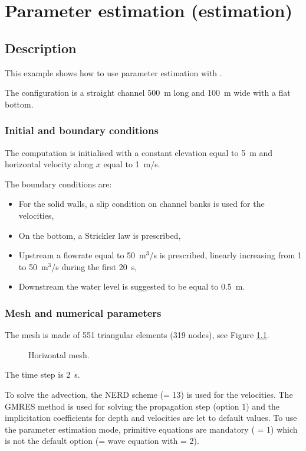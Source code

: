 \chapter{Parameter estimation (estimation)}

\section{Description}

This example shows how to use parameter estimation with .

The configuration is a straight channel 500~m long and 100~m wide
with a flat bottom.

\subsection{Initial and boundary conditions}

The computation is initialised with a constant elevation equal to 5~m
and horizontal velocity along $x$ equal to 1~m/s.

The boundary conditions are:
\begin{itemize}
\item For the solid walls, a slip condition on channel banks is used for the
velocities,
\item On the bottom, a Strickler law is prescribed,
\item Upstream a flowrate equal to 50~m$^3$/s is prescribed,
linearly increasing from 1 to 50~m$^3$/s during the first 20~s,
\item Downstream the water level is suggested to be equal to 0.5~m.
\end{itemize}

\subsection{Mesh and numerical parameters}

The mesh is made of 551 triangular elements (319 nodes),
see Figure \ref{t2d:estimation:fig:mesh}.

\begin{figure}[!htbp]
 \centering
 \caption{Horizontal mesh.}
 \label{t2d:estimation:fig:mesh}
\end{figure}

The time step is 2~s.

To solve the advection, the NERD scheme (= 13) is used for the velocities.
The GMRES method
is used for solving the propagation step (option 1) and
the implicitation coefficients
for depth and velocities are let to default values.
To use the parameter estimation mode, primitive equations are mandatory
( = 1) which is not the default option
(= wave equation with  = 2).

